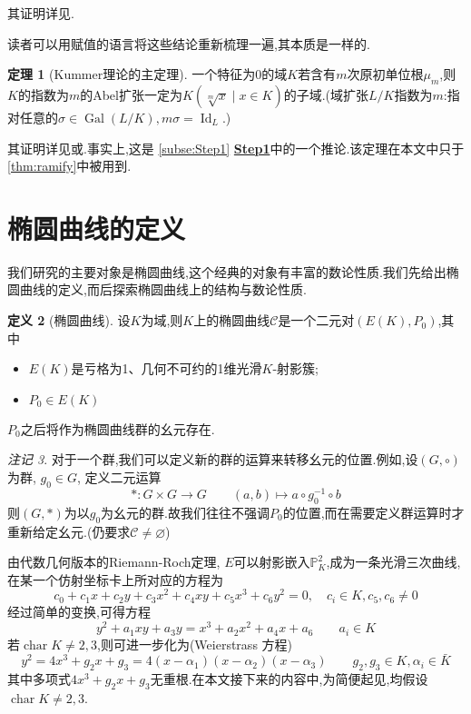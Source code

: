 \documentclass[12pt,A4paper,oneside,reqno]{amsart}
\numberwithin{equation}{section}
\theoremstyle{definition}
\newtheorem{theorem}{定理}[section]
\newtheorem{defn}[theorem]{定义}
\theoremstyle{plain}
\theoremstyle{plain}
\numberwithin{equation}{section}
\theoremstyle{remark}
\newtheorem{remark}[theorem]{注记}
\DeclareMathOperator{\Id}{\operatorname{Id}}
\DeclareMathOperator{\cha}{\operatorname{char}}
\newcommand{\Gal}{\operatorname{Gal}}
\begin{document}
其证明详见\cite[p38, Proposition 3.4.4]{yichaolectures}.

读者可以用赋值的语言将这些结论重新梳理一遍,其本质是一样的.
\begin{theorem}[Kummer理论的主定理]\label{thm:kummer}
	一个特征为0的域$K$若含有$m$次原初单位根$\mu_m$,则$K$的指数为$m$的Abel扩张一定为$K(\sqrt[m]{x} \mid x \in K)$的子域.(域扩张$L/K$指数为$m$:指对任意的$\sigma \in \Gal(L/K), m\sigma =\Id_L$.)
		
	其证明详见\cite[p105, Theorem 11.4]{morandi2012field}或\cite[p816, Example]{dummit2004richard}.事实上,这是 \ref{subse:Step1} \textbf{\underline{Step1}}中的一个推论.该定理在本文中只于\ref{thm:ramify}中被用到.
\end{theorem}
\section{椭圆曲线的定义}
我们研究的主要对象是椭圆曲线,这个经典的对象有丰富的数论性质.我们先给出椭圆曲线的定义,而后探索椭圆曲线上的结构与数论性质.
\begin{defn}[椭圆曲线]
	设$K$为域,则$K$上的椭圆曲线$\mathcal{C}$是一个二元对$(E(K),P_0)$,其中
	\begin{itemize}
		\item $E(K)$是亏格为1、几何不可约的1维光滑$K$-射影簇;
		\item $P_0 \in E(K)$
	\end{itemize}
$P_0$之后将作为椭圆曲线群的幺元存在.
\end{defn}
\begin{remark}
	对于一个群,我们可以定义新的群的运算来转移幺元的位置.例如,设$(G,\circ)$为群, $g_0 \in G$, 定义二元运算
	$$*\colon G \times G \longrightarrow G \qquad (a,b) \longmapsto a \circ g_0^{-1} \circ b$$
	则$(G,*)$为以$g_0$为幺元的群.故我们往往不强调$P_0$的位置,而在需要定义群运算时才重新给定幺元.(仍要求$\mathcal{C} \neq \varnothing$)
\end{remark}
由代数几何版本的Riemann-Roch定理, $E$可以射影嵌入$\mathbb{P}_K^2$,成为一条光滑三次曲线,在某一个仿射坐标卡上所对应的方程为
$$c_0+c_1x+c_2y+c_3x^2+c_4xy+c_5x^3+c_6y^2=0, \quad c_i \in K, c_5,c_6 \neq 0$$
经过简单的变换,可得方程
$$y^2+a_1xy+a_3y=x^3+a_2x^2+a_4x+a_6 \qquad a_i \in K$$
若$\cha K \neq 2,3$,则可进一步化为(Weierstrass 方程)
$$y^2=4x^3+g_2x+g_3=4(x-\alpha_1)(x-\alpha_2)(x-\alpha_3) \qquad g_2,g_3 \in K, \alpha_i \in \bar{K}$$
其中多项式$4x^3+g_2x+g_3$无重根.在本文接下来的内容中,为简便起见,均假设$\cha K \neq 2,3$.
\end{document}
